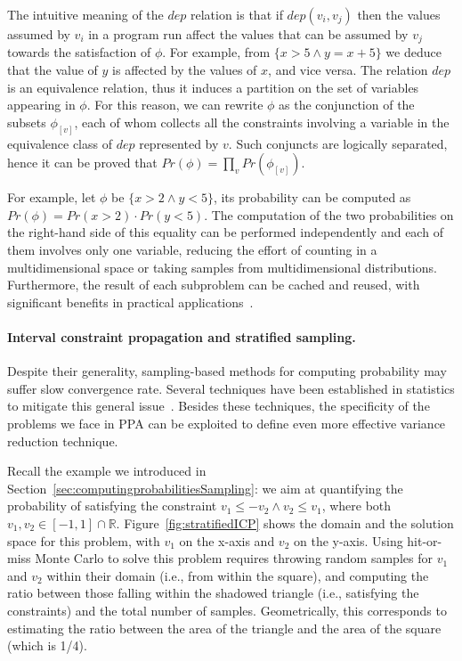 The intuitive meaning of the $\textit{dep}$ relation is that if $\textit{dep}(v_i,v_j)$ then the values assumed by $v_i$ in a program run affect the values that can be assumed by $v_j$ towards the satisfaction of $\phi$. For example, from $\{x>5 \land y=x+5\}$ we deduce that the value of $y$ is affected by the values of $x$, and vice versa. The relation $\textit{dep}$ is an equivalence relation, thus it induces a partition on the set of variables appearing in $\phi$. For this reason, we can rewrite $\phi$ as the conjunction of the subsets $\phi_{[v]}$, each of whom collects all the constraints involving a variable in the equivalence class of $\textit{dep}$ represented by $v$. Such conjuncts are logically separated, hence it can be proved that $\textit{Pr}(\phi)= \prod_{v} \textit{Pr}(\phi_{[v]})$. 

For example, let $\phi$ be $\{x>2 \land y<5\}$, its probability can be computed as $\textit{Pr}(\phi)=\textit{Pr}(x>2) \cdot \textit{Pr}(y<5)$. The computation of the two probabilities on the right-hand side of this equality can be performed independently and each of them involves only one variable, reducing the effort of counting in a multidimensional space or taking samples from multidimensional distributions. Furthermore, the result of each subproblem can be cached and reused, with significant benefits in practical applications~\cite{Filieri2013}.


\paragraph{Interval constraint propagation and stratified sampling.}
Despite their generality, sampling-based methods for computing probability may suffer slow convergence rate. Several techniques have been established in statistics to mitigate this general issue~\cite{Robert2005MCBook}. Besides these techniques, the specificity of the problems we face in PPA can be exploited to define even more effective variance reduction technique.

Recall the example we introduced in Section~\ref{sec:computingprobabilitiesSampling}: we aim at quantifying the probability of satisfying the constraint 
$v_1 \leq -v_2 \land v_2 \leq v_1$, where both $v_1, v_2 \in [-1, 1] \cap \mathbb{R}$. Figure~\ref{fig:stratifiedICP} shows the domain and the solution space for this problem, with $v_1$ on the x-axis and $v_2$ on the y-axis. Using hit-or-miss Monte Carlo to solve this problem requires throwing random samples for $v_1$ and $v_2$ within their domain (i.e., from within the square), and computing the ratio between those falling within the shadowed triangle (i.e., satisfying the constraints) and the total number of samples. Geometrically, this corresponds to estimating the ratio between the area of the triangle and the area of the square (which is 1/4).

